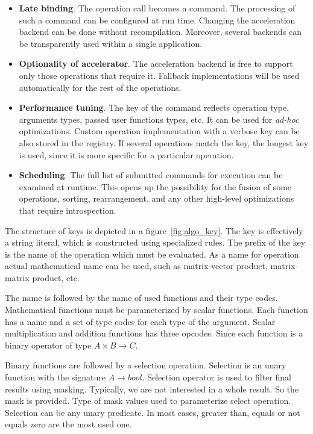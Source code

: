 \begin{itemize}
    \item \textbf{Late binding}. The operation call becomes a command. The processing of such a command can be configured at run time. Changing the acceleration backend can be done without recompilation. Moreover, several backends can be transparently used within a single application.
    
    \item \textbf{Optionality of accelerator}. The acceleration backend is free to support only those operations that require it. Fallback implementations will be used automatically for the rest of the operations.
    
    \item \textbf{Performance tuning}. The key of the command reflects operation type, arguments types, passed user functions types, etc. It can be used for \textit{ad-hoc} optimizations. Custom operation implementation with a verbose key can be also stored in the registry. If several operations match the key, the longest key is used, since it is more specific for a particular operation.
    
    \item \textbf{Scheduling}. The full list of submitted commands for execution can be examined at runtime. This opens up the possibility for the fusion of some operations, sorting, rearrangement, and any other high-level optimizations that require introspection.
\end{itemize}

The structure of keys is depicted in a figure~\ref{fig:algo_key}. The key is effectively a string literal, which is constructed using specialized rules. The prefix of the key is the name of the operation which must be evaluated. As a name for operation actual mathematical name can be used, such as matrix-vector product, matrix-matrix product, etc. 

The name is followed by the name of used functions and their type codes. Mathematical functions must be parameterized by scalar functions. Each function has a name and a set of type codes for each type of the argument. Scalar multiplication and addition functions has three opcodes. Since each function is a binary operator of type $A \times B \xrightarrow{} C$. 

Binary functions are followed by a selection operation. Selection is an unary function with the signature $A \xrightarrow{} bool$. Selection operator is used to filter final results using masking. Typically, we are not interested in a whole result. So the mask is provided. Type of mask values used to parameterize select operation. Selection can be any unary predicate. In most cases, greater than, equals or not equals zero are the most used one.

